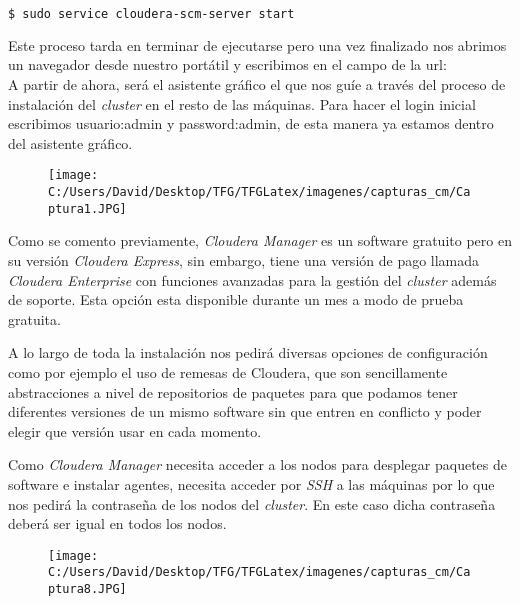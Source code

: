 \begin{lstlisting}[language=bash, numbers=none]
$ sudo service cloudera-scm-server start
\end{lstlisting}

Este proceso tarda en terminar de ejecutarse pero una vez finalizado nos abrimos un navegador desde nuestro
portátil y escribimos en el campo de la url: \\
A partir de ahora, será el asistente gráfico el que nos guíe a través del proceso de instalación del
\textit{cluster} en el resto de las máquinas. Para hacer el login inicial escribimos usuario:admin y 
password:admin, de esta manera ya estamos dentro del asistente gráfico.

\begin{figure}[!htpb]
  \centering
  \texttt{[image: C:/Users/David/Desktop/TFG/TFGLatex/imagenes/capturas\_cm/Captura1.JPG]}
\end{figure}

Como se comento previamente, \textit{Cloudera Manager} es un software gratuito pero en su versión \textit{Cloudera Express},
sin embargo, tiene una versión de pago llamada \textit{Cloudera Enterprise} con funciones avanzadas para la gestión del
\textit{cluster} además de soporte. Esta opción esta disponible durante un mes a modo de prueba gratuita.
\newline

A lo largo de toda la instalación nos pedirá diversas opciones de configuración como por ejemplo el uso de
remesas de Cloudera, que son sencillamente abstracciones a nivel de repositorios de paquetes para que
podamos tener diferentes versiones de un mismo software sin que entren en conflicto y poder elegir que
versión usar en cada momento.
\newline

Como \textit{Cloudera Manager} necesita acceder a los nodos para desplegar paquetes de software e instalar agentes, necesita
acceder por \textit{SSH} a las máquinas por lo que nos pedirá la contraseña de los nodos del \textit{cluster}.
En este caso dicha contraseña deberá ser igual en todos los nodos.

\clearpage

\begin{figure}[!htpb]
  \centering
  \texttt{[image: C:/Users/David/Desktop/TFG/TFGLatex/imagenes/capturas\_cm/Captura8.JPG]}
\end{figure}

